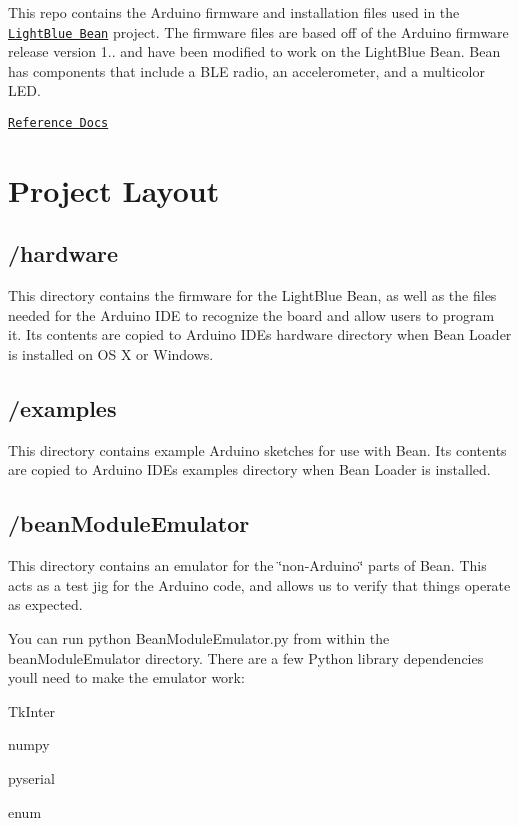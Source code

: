 This repo contains the Arduino firmware and installation files used in the \href{https://punchthrough.com/bean}{\tt Light\+Blue Bean} project. The firmware files are based off of the Arduino firmware release version 1.. and have been modified to work on the Light\+Blue Bean. Bean has components that include a B\+LE radio, an accelerometer, and a multicolor L\+ED.

\href{https://punchthrough.com/bean/reference}{\tt Reference Docs}

\section*{Project Layout}

\subsection*{/hardware}

This directory contains the firmware for the Light\+Blue Bean, as well as the files needed for the Arduino I\+DE to recognize the board and allow users to program it. Its contents are copied to Arduino I\+DE\textquotesingle{}s {\ttfamily hardware} directory when Bean Loader is installed on OS X or Windows.

\subsection*{/examples}

This directory contains example Arduino sketches for use with Bean. Its contents are copied to Arduino I\+DE\textquotesingle{}s {\ttfamily examples} directory when Bean Loader is installed.

\subsection*{/bean\+Module\+Emulator}

This directory contains an emulator for the \char`\"{}non-\/\+Arduino\char`\"{} parts of Bean. This acts as a test jig for the Arduino code, and allows us to verify that things operate as expected.

You can run {\ttfamily python Bean\+Module\+Emulator.\+py} from within the bean\+Module\+Emulator directory. There are a few Python library dependencies you\textquotesingle{}ll need to make the emulator work\+:


\begin{DoxyItemize}
\item Tk\+Inter
\item numpy
\item pyserial
\item enum
\end{DoxyItemize}

